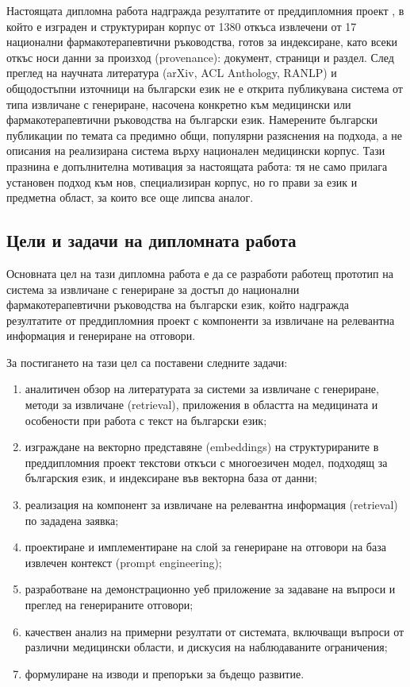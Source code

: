 \documentclass[12pt,a4paper]{article}
\begin{document}
Настоящата дипломна работа надгражда резултатите от преддипломния проект \cite{pashovska2026pdp}, в който е изграден и структуриран корпус от 1380 откъса извлечени от 17 национални фармакотерапевтични ръководства, готов за индексиране, като всеки откъс носи данни за произход (provenance): документ, страници и раздел. След преглед на научната литература (arXiv, ACL Anthology, RANLP) и общодостъпни източници на български език не е открита публикувана система от типа извличане с генериране, насочена конкретно към медицински или фармакотерапевтични ръководства на български език. Намерените български публикации по темата са предимно общи, популярни разяснения на подхода, а не описания на реализирана система върху национален медицински корпус. Тази празнина е допълнителна мотивация за настоящата работа: тя не само прилага установен подход към нов, специализиран корпус, но го прави за език и предметна област, за които все още липсва аналог. 

\subsection{Цели и задачи на дипломната работа}
Основната цел на тази дипломна работа е да се разработи работещ прототип на система за извличане с генериране за достъп до национални фармакотерапевтични ръководства на български език, който надгражда резултатите от преддипломния проект с компоненти за извличане на релевантна информация и генериране на отговори.

За постигането на тази цел са поставени следните задачи:
\begin{enumerate}[noitemsep]
\item аналитичен обзор на литературата за системи за извличане с генериране, методи за извличане (retrieval), приложения в областта на медицината и особености при работа с текст на български език;
\item изграждане на векторно представяне (embeddings) на структурираните в преддипломния проект текстови откъси с многоезичен модел, подходящ за българския език, и индексиране във векторна база от данни;
\item реализация на компонент за извличане на релевантна информация (retrieval) по зададена заявка;
\item проектиране и имплементиране на слой за генериране на отговори на база извлечен контекст (prompt engineering);
\item разработване на демонстрационно уеб приложение за задаване на въпроси и преглед на генерираните отговори;
\item качествен анализ на примерни резултати от системата, включващи въпроси от различни медицински области, и дискусия на наблюдаваните ограничения;
\item формулиране на изводи и препоръки за бъдещо развитие.
\end{enumerate}
\end{document}
